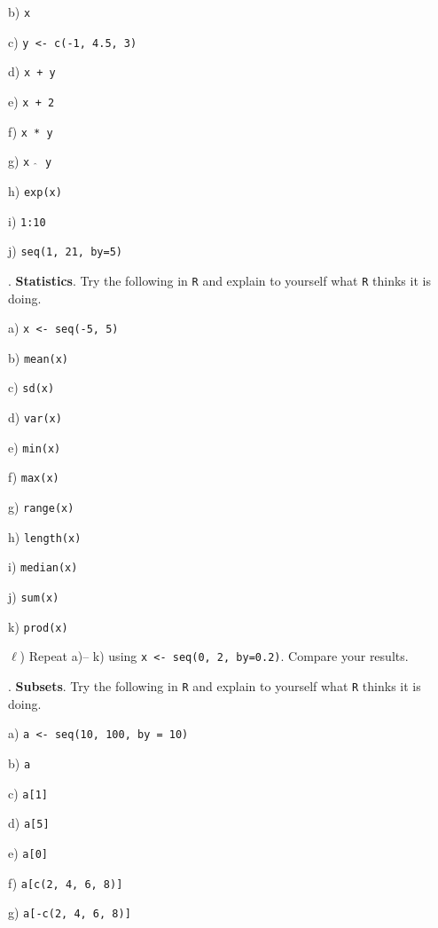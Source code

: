 \documentclass[10pt]{article}
\newcounter{EX}\setcounter{EX}{1}
\newcommand{\EXERCISE}{\arabic{EX}.\stepcounter{EX} }
\begin{document}
\SUBX b) \texttt{x}
\BSK

\SUBX c) \texttt{y <- c(-1, 4.5, 3)}
\BSK

\SUBX d) \texttt{x + y}
\BSK

\SUBX e) \texttt{x + 2}
\BSK

\SUBX f) \texttt{x * y}
\BSK

\SUBX g) \texttt{x  $\widehat{\hspace{3pt}}$  y}
\BSK

\SUBX h) \texttt{exp(x)}
\BSK

\SUBX i) \texttt{1:10}
\BSK

\SUBX j) \texttt{seq(1, 21, by=5)}
\BSK

\vfill
\eject

\EXERCISE \textbf{Statistics}.
Try the following in \texttt{R} and explain to yourself
what \texttt{R} thinks it is doing.

\SUBX a) \texttt{x <- seq(-5, 5)} %
\BSK

\SUBX b) \texttt{mean(x)}
\BSK

\SUBX c) \texttt{sd(x)}
\BSK

\SUBX d) \texttt{var(x)}
\BSK

\SUBX e) \texttt{min(x)}
\BSK

\SUBX f) \texttt{max(x)}
\BSK

\SUBX g) \texttt{range(x)}
\BSK

\SUBX h) \texttt{length(x)}
\BSK

\SUBX i) \texttt{median(x)}
\BSK

\SUBX j) \texttt{sum(x)}
\BSK

\SUBX k) \texttt{prod(x)}
\BSK

\SUBX $\ell$) Repeat a)-- k) using \texttt{x <- seq(0, 2, by=0.2)}.  
Compare your results.
\vspace{.6in}

\EXERCISE \textbf{Subsets}.  Try the following in \texttt{R} and explain to yourself
what \texttt{R} thinks it is doing.

\SUBX a) \texttt{a <- seq(10, 100, by = 10)}
\BSK

\SUBX b) \texttt{a}
\BSK

\SUBX c) \texttt{a[1]}
\BSK

\SUBX d) \texttt{a[5]}
\BSK

\SUBX e) \texttt{a[0]}
\BSK

\SUBX f) \texttt{a[c(2, 4, 6, 8)]}
\BSK

\SUBX g) \texttt{a[-c(2, 4, 6, 8)]}
\BSK
\end{document}
